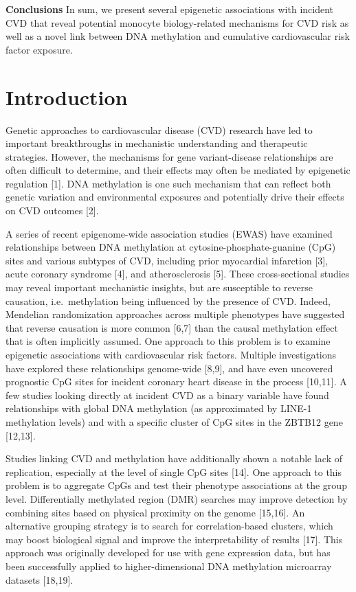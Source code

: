 \documentclass[]{article}
\theoremstyle{definition}
\theoremstyle{definition}
\theoremstyle{definition}
\theoremstyle{remark}
\begin{document}
\textbf{Conclusions} In sum, we present several epigenetic associations
with incident CVD that reveal potential monocyte biology-related
mechanisms for CVD risk as well as a novel link between DNA methylation
and cumulative cardiovascular risk factor exposure.

\section{Introduction}\label{introduction}

Genetic approaches to cardiovascular disease (CVD) research have led to
important breakthroughs in mechanistic understanding and therapeutic
strategies. However, the mechanisms for gene variant-disease
relationships are often difficult to determine, and their effects may
often be mediated by epigenetic regulation {[}1{]}. DNA methylation is
one such mechanism that can reflect both genetic variation and
environmental exposures and potentially drive their effects on CVD
outcomes {[}2{]}.

A series of recent epigenome-wide association studies (EWAS) have
examined relationships between DNA methylation at
cytosine-phosphate-guanine (CpG) sites and various subtypes of CVD,
including prior myocardial infarction {[}3{]}, acute coronary syndrome
{[}4{]}, and atherosclerosis {[}5{]}. These cross-sectional studies may
reveal important mechanistic insights, but are susceptible to reverse
causation, i.e.~methylation being influenced by the presence of CVD.
Indeed, Mendelian randomization approaches across multiple phenotypes
have suggested that reverse causation is more common {[}6,7{]} than the
causal methylation effect that is often implicitly assumed. One approach
to this problem is to examine epigenetic associations with
cardiovascular risk factors. Multiple investigations have explored these
relationships genome-wide {[}8,9{]}, and have even uncovered prognostic
CpG sites for incident coronary heart disease in the process
{[}10,11{]}. A few studies looking directly at incident CVD as a binary
variable have found relationships with global DNA methylation (as
approximated by LINE-1 methylation levels) and with a specific cluster
of CpG sites in the ZBTB12 gene {[}12,13{]}.

Studies linking CVD and methylation have additionally shown a notable
lack of replication, especially at the level of single CpG sites
{[}14{]}. One approach to this problem is to aggregate CpGs and test
their phenotype associations at the group level. Differentially
methylated region (DMR) searches may improve detection by combining
sites based on physical proximity on the genome {[}15,16{]}. An
alternative grouping strategy is to search for correlation-based
clusters, which may boost biological signal and improve the
interpretability of results {[}17{]}. This approach was originally
developed for use with gene expression data, but has been successfully
applied to higher-dimensional DNA methylation microarray datasets
{[}18,19{]}.
\end{document}

